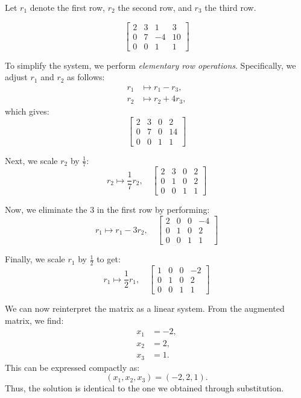 \begin{example}
    \label{ex:augmented-matrix}
Let $r_1$ denote the first row, $r_2$ the second row, and $r_3$ the third row.

\[
\left[\begin{array}{cccc}
2 & 3 & 1 & 3 \\
0 & 7 & -4 & 10 \\
0 & 0 & 1 & 1
\end{array}\right]
\]

To simplify the system, we perform \textit{elementary row operations}. Specifically, we adjust $r_1$ and $r_2$ as follows:
\[
\begin{aligned}
r_1 & \mapsto r_1 - r_3, \\
r_2 & \mapsto r_2 + 4r_3,
\end{aligned}
\]
which gives:
\[
\left[\begin{array}{cccc}
2 & 3 & 0 & 2 \\
0 & 7 & 0 & 14 \\
0 & 0 & 1 & 1
\end{array}\right]
\]

Next, we scale $r_2$ by $\frac{1}{7}$:
\[
r_2 \mapsto \frac{1}{7}r_2, \quad \left[\begin{array}{cccc}
2 & 3 & 0 & 2 \\
0 & 1 & 0 & 2 \\
0 & 0 & 1 & 1
\end{array}\right]
\]

Now, we eliminate the $3$ in the first row by performing:
\[
r_1 \mapsto r_1 - 3r_2, \quad \left[\begin{array}{cccc}
2 & 0 & 0 & -4 \\
0 & 1 & 0 & 2 \\
0 & 0 & 1 & 1
\end{array}\right]
\]

Finally, we scale $r_1$ by $\frac{1}{2}$ to get:
\[
r_1 \mapsto \frac{1}{2}r_1, \quad \left[\begin{array}{cccc}
1 & 0 & 0 & -2 \\
0 & 1 & 0 & 2 \\
0 & 0 & 1 & 1
\end{array}\right]
\]

We can now reinterpret the matrix as a linear system. From the augmented matrix, we find:
\[
\begin{aligned}
x_1 &= -2, \\
x_2 &= 2, \\
x_3 &= 1.
\end{aligned}
\]
This can be expressed compactly as:
\[
(x_1, x_2, x_3) = (-2, 2, 1).
\]
Thus, the solution is identical to the one we obtained through substitution.
\end{example}

